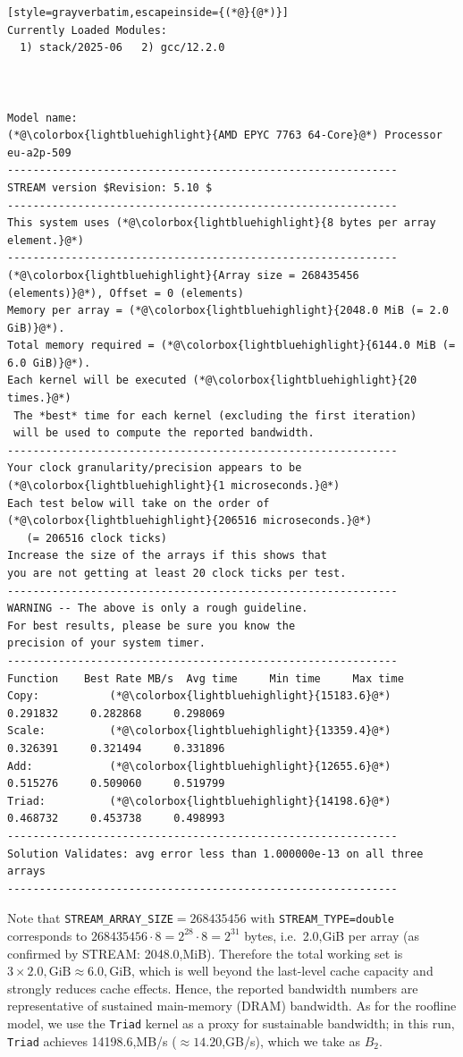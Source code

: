 \documentclass[unicode,10pt,a4paper,oneside,numbers=endperiod,openany]{scrartcl}
\begin{document}
\begin{lstlisting}[style=grayverbatim,escapeinside={(*@}{@*)}]
Currently Loaded Modules:
  1) stack/2025-06   2) gcc/12.2.0



Model name:                              (*@\colorbox{lightbluehighlight}{AMD EPYC 7763 64-Core}@*) Processor
eu-a2p-509
-------------------------------------------------------------
STREAM version $Revision: 5.10 $
-------------------------------------------------------------
This system uses (*@\colorbox{lightbluehighlight}{8 bytes per array element.}@*)
-------------------------------------------------------------
(*@\colorbox{lightbluehighlight}{Array size = 268435456 (elements)}@*), Offset = 0 (elements)
Memory per array = (*@\colorbox{lightbluehighlight}{2048.0 MiB (= 2.0 GiB)}@*).
Total memory required = (*@\colorbox{lightbluehighlight}{6144.0 MiB (= 6.0 GiB)}@*).
Each kernel will be executed (*@\colorbox{lightbluehighlight}{20 times.}@*)
 The *best* time for each kernel (excluding the first iteration)
 will be used to compute the reported bandwidth.
-------------------------------------------------------------
Your clock granularity/precision appears to be (*@\colorbox{lightbluehighlight}{1 microseconds.}@*)
Each test below will take on the order of (*@\colorbox{lightbluehighlight}{206516 microseconds.}@*)
   (= 206516 clock ticks)
Increase the size of the arrays if this shows that
you are not getting at least 20 clock ticks per test.
-------------------------------------------------------------
WARNING -- The above is only a rough guideline.
For best results, please be sure you know the
precision of your system timer.
-------------------------------------------------------------
Function    Best Rate MB/s  Avg time     Min time     Max time
Copy:           (*@\colorbox{lightbluehighlight}{15183.6}@*)     0.291832     0.282868     0.298069
Scale:          (*@\colorbox{lightbluehighlight}{13359.4}@*)     0.326391     0.321494     0.331896
Add:            (*@\colorbox{lightbluehighlight}{12655.6}@*)     0.515276     0.509060     0.519799
Triad:          (*@\colorbox{lightbluehighlight}{14198.6}@*)     0.468732     0.453738     0.498993
-------------------------------------------------------------
Solution Validates: avg error less than 1.000000e-13 on all three arrays
-------------------------------------------------------------
\end{lstlisting}
Note that \texttt{STREAM\_ARRAY\_SIZE}$=268435456$ with \texttt{STREAM\_TYPE=double} corresponds to
$268435456 \cdot 8 = 2^{28}\cdot 8 = 2^{31}$ bytes, i.e.\ 2.0,GiB per array (as confirmed by STREAM: 2048.0,MiB).
Therefore the total working set is $3 \times 2.0,\text{GiB} \approx 6.0,\text{GiB}$, which is well beyond the last-level
cache capacity and strongly reduces cache effects. Hence, the reported bandwidth numbers are representative of
sustained main-memory (DRAM) bandwidth. As for the roofline model, we use the \texttt{Triad} kernel as a proxy for
sustainable bandwidth; in this run, \texttt{Triad} achieves 14198.6,MB/s ($\approx 14.20$,GB/s), which we take as $B_2$.
\end{document}
